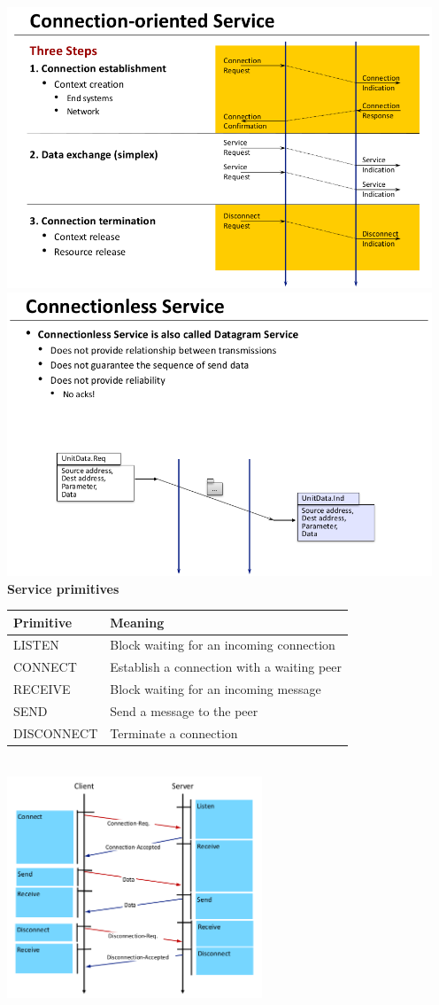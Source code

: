\documentclass[11pt,ngerman]{article}
\begin{document}
\includegraphics[width=5in]{images/Selection_008.png}\\
\includegraphics[width=5in]{images/Selection_009.png}\\

\textbf{Service primitives}\\
\begin{tabular}[t]{ll}
Primitive & Meaning\\
\hline
LISTEN & Block	waiting	for	an	incoming	connection\\
CONNECT & Establish	a	connection	with	a	waiting	peer\\
RECEIVE & Block	waiting	for	an	incoming	message\\
SEND & Send	a	message	to	the	peer\\
DISCONNECT & Terminate	a	connection\\
\end{tabular}\\
\includegraphics[width=3in]{images/Selection_010.png}\\
\end{document}
